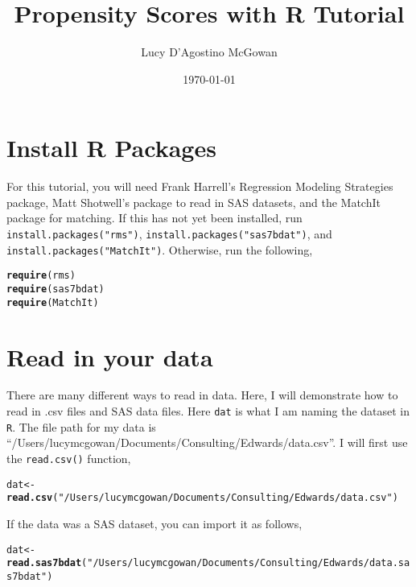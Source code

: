 \documentclass{article}\usepackage[]{graphicx}\usepackage[]{color}
\title{Propensity Scores with R Tutorial}
\author{Lucy D'Agostino McGowan}
\date{\today}
\makeatletter
\newcommand{\hlstr}[1]{\textcolor[rgb]{0.192,0.494,0.8}{#1}}%
\newcommand{\hlstd}[1]{\textcolor[rgb]{0.345,0.345,0.345}{#1}}%
\newcommand{\hlkwb}[1]{\textcolor[rgb]{0.69,0.353,0.396}{#1}}%
\newcommand{\hlkwd}[1]{\textcolor[rgb]{0.737,0.353,0.396}{\textbf{#1}}}%
\newenvironment{kframe}{%
 \def\at@end@of@kframe{}%
 \ifinner\ifhmode%
  \def\at@end@of@kframe{\end{minipage}}%
  \begin{minipage}{\columnwidth}%
 \fi\fi%
 \def\FrameCommand##1{\hskip\@totalleftmargin \hskip-\fboxsep
 \colorbox{shadecolor}{##1}\hskip-\fboxsep
     \hskip-\linewidth \hskip-\@totalleftmargin \hskip\columnwidth}%
 \MakeFramed {\advance\hsize-\width
   \@totalleftmargin\z@ \linewidth\hsize
   \@setminipage}}%
 {\par\unskip\endMakeFramed%
 \at@end@of@kframe}
\newenvironment{knitrout}{}{} %
\makeatother
\begin{document}
 	\pagestyle{fancy}
\allowdisplaybreaks
\maketitle
\section*{Install R Packages}
For this tutorial, you will need Frank Harrell's Regression Modeling Strategies package, Matt Shotwell's package to read in SAS datasets, and the MatchIt package for matching. If this has not yet been installed, run \texttt{install.packages("rms")}, \texttt{install.packages("sas7bdat")}, and \texttt{install.packages("MatchIt")}. Otherwise, run the following,
\begin{knitrout}
\color{fgcolor}\begin{kframe}
\begin{alltt}
\hlkwd{require}\hlstd{(rms)}
\hlkwd{require}\hlstd{(sas7bdat)}
\hlkwd{require}\hlstd{(MatchIt)}
\end{alltt}
\end{kframe}
\end{knitrout}
\section*{Read in your data}
There are many different ways to read in data. Here, I will demonstrate how to read in .csv files and SAS data files. Here \texttt{dat} is what I am naming the dataset in \texttt{R}. The file path for my data is\\ ``/Users/lucymcgowan/Documents/Consulting/Edwards/data.csv''. I will first use the \texttt{read.csv()} function,
\begin{knitrout}
\color{fgcolor}\begin{kframe}
\begin{alltt}
\hlstd{dat}\hlkwb{<-}\hlkwd{read.csv}\hlstd{(}\hlstr{"/Users/lucymcgowan/Documents/Consulting/Edwards/data.csv"}\hlstd{)}
\end{alltt}
\end{kframe}
\end{knitrout}
If the data was a SAS dataset, you can import it as follows,
\begin{knitrout}
\color{fgcolor}\begin{kframe}
\begin{alltt}
\hlstd{dat}\hlkwb{<-}\hlkwd{read.sas7bdat}\hlstd{(}\hlstr{"/Users/lucymcgowan/Documents/Consulting/Edwards/data.sas7bdat"}\hlstd{)}
\end{alltt}
\end{kframe}
\end{knitrout}
\end{document}
